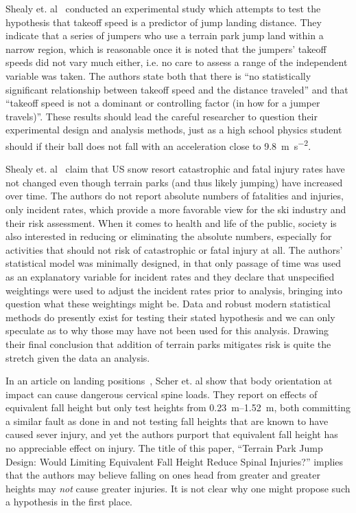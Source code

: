 \documentclass{article}
\begin{document}
Shealy et. al~\cite{Shealy2010} conducted an experimental study which attempts
to test the hypothesis that takeoff speed is a predictor of jump landing
distance. They indicate that a series of jumpers who use a terrain park jump
land within a narrow region, which is reasonable once it is noted that the
jumpers' takeoff speeds did not vary much either, i.e. no care to assess a
range of the independent variable was taken. The authors state both that there
is ``no statistically significant relationship between takeoff speed and the
distance traveled'' and that ``takeoff speed is not a dominant or controlling
factor (in how for a jumper travels)''. These results should lead the careful
researcher to question their experimental design and analysis methods, just as
a high school physics student should if their ball does not fall with an
acceleration close to 9.8~\si{\meter\per\second\squared}.

Shealy et. al~\cite{Shealy2015} claim that US snow resort catastrophic and
fatal injury rates have not changed even though terrain parks (and thus likely
jumping) have increased over time. The authors do not report absolute numbers
of fatalities and injuries, only incident rates, which provide a more favorable
view for the ski industry and their risk assessment. When it comes to health
and life of the public, society is also interested in reducing or eliminating
the absolute numbers, especially for activities that should not risk of
catastrophic or fatal injury at all. The authors' statistical model was
minimally designed, in that only passage of time was used as an explanatory
variable for incident rates and they declare that unspecified weightings were
used to adjust the incident rates prior to analysis, bringing into question
what these weightings might be.  Data and robust modern statistical methods do
presently exist for testing their stated hypothesis and we can only speculate
as to why those may have not been used for this analysis. Drawing their final
conclusion that addition of terrain parks mitigates risk is quite the stretch
given the data an analysis.

In an article on landing positions~\cite{Scher2015}, Scher et. al show that
body orientation at impact can cause dangerous cervical spine loads. They
report on effects of equivalent fall height but only test heights from
\SIrange{0.23}{1.52}{\meter}, both committing a similar fault as done in
\cite{Shealy2010} and not testing fall heights that are known to have caused
sever injury, and yet the authors purport that equivalent fall height has no
appreciable effect on injury. The title of this paper, ``Terrain Park Jump
Design: Would Limiting Equivalent Fall Height Reduce Spinal Injuries?'' implies
that the authors may believe falling on ones head from greater and greater
heights may \emph{not} cause greater injuries. It is not clear why one might
propose such a hypothesis in the first place.
\end{document}
